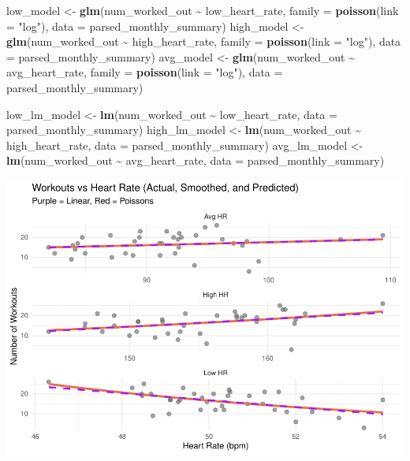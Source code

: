 \documentclass[
  11pt,
]{article}
\newenvironment{Shaded}{\begin{snugshade}}{\end{snugshade}}
\newcommand{\AttributeTok}[1]{\textcolor[rgb]{0.13,0.29,0.53}{#1}}
\newcommand{\FunctionTok}[1]{\textcolor[rgb]{0.13,0.29,0.53}{\textbf{#1}}}
\newcommand{\NormalTok}[1]{#1}
\newcommand{\OtherTok}[1]{\textcolor[rgb]{0.56,0.35,0.01}{#1}}
\newcommand{\SpecialCharTok}[1]{\textcolor[rgb]{0.81,0.36,0.00}{\textbf{#1}}}
\newcommand{\StringTok}[1]{\textcolor[rgb]{0.31,0.60,0.02}{#1}}
\begin{document}
\begin{Shaded}
\begin{Highlighting}[]
\NormalTok{low\_model }\OtherTok{\textless{}{-}} \FunctionTok{glm}\NormalTok{(num\_worked\_out }\SpecialCharTok{\textasciitilde{}}\NormalTok{ low\_heart\_rate, }\AttributeTok{family =} \FunctionTok{poisson}\NormalTok{(}\AttributeTok{link =} \StringTok{"log"}\NormalTok{), }
                 \AttributeTok{data =}\NormalTok{ parsed\_monthly\_summary)}
\NormalTok{high\_model }\OtherTok{\textless{}{-}} \FunctionTok{glm}\NormalTok{(num\_worked\_out }\SpecialCharTok{\textasciitilde{}}\NormalTok{ high\_heart\_rate, }\AttributeTok{family =} \FunctionTok{poisson}\NormalTok{(}\AttributeTok{link =} \StringTok{"log"}\NormalTok{), }
                  \AttributeTok{data =}\NormalTok{ parsed\_monthly\_summary)}
\NormalTok{avg\_model }\OtherTok{\textless{}{-}} \FunctionTok{glm}\NormalTok{(num\_worked\_out }\SpecialCharTok{\textasciitilde{}}\NormalTok{ avg\_heart\_rate, }\AttributeTok{family =} \FunctionTok{poisson}\NormalTok{(}\AttributeTok{link =} \StringTok{"log"}\NormalTok{), }
                 \AttributeTok{data =}\NormalTok{ parsed\_monthly\_summary)}

\NormalTok{low\_lm\_model }\OtherTok{\textless{}{-}} \FunctionTok{lm}\NormalTok{(num\_worked\_out }\SpecialCharTok{\textasciitilde{}}\NormalTok{ low\_heart\_rate, }\AttributeTok{data =}\NormalTok{ parsed\_monthly\_summary)}
\NormalTok{high\_lm\_model }\OtherTok{\textless{}{-}} \FunctionTok{lm}\NormalTok{(num\_worked\_out }\SpecialCharTok{\textasciitilde{}}\NormalTok{ high\_heart\_rate, }\AttributeTok{data =}\NormalTok{ parsed\_monthly\_summary)}
\NormalTok{avg\_lm\_model }\OtherTok{\textless{}{-}} \FunctionTok{lm}\NormalTok{(num\_worked\_out }\SpecialCharTok{\textasciitilde{}}\NormalTok{ avg\_heart\_rate, }\AttributeTok{data =}\NormalTok{ parsed\_monthly\_summary)}
\end{Highlighting}
\end{Shaded}

\includegraphics{analysis_files/figure-latex/unnamed-chunk-9-1.pdf}
\end{document}

